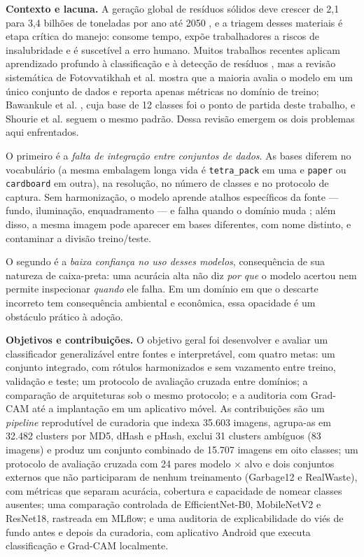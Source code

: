 \documentclass[11pt,a4paper]{article}
\begin{document}
	\textbf{Contexto e lacuna.} A geração global de resíduos sólidos deve crescer de 2,1 para 3,4 bilhões de toneladas por ano até 2050 \cite{kaza2018}, e a triagem desses materiais é etapa crítica do manejo: consome tempo, expõe trabalhadores a riscos de insalubridade e é suscetível a erro humano. Muitos trabalhos recentes aplicam aprendizado profundo à classificação e à detecção de resíduos \cite{fotovvatikhah2025,bawankule2023,shourie2024}, mas a revisão sistemática de Fotovvatikhah et al. \cite{fotovvatikhah2025} mostra que a maioria avalia o modelo em um único conjunto de dados e reporta apenas métricas no domínio de treino; Bawankule et al. \cite{bawankule2023}, cuja base de 12 classes foi o ponto de partida deste trabalho, e Shourie et al. \cite{shourie2024} seguem o mesmo padrão. Dessa revisão emergem os dois problemas aqui enfrentados.
	
	O primeiro é a \emph{falta de integração entre conjuntos de dados}. As bases diferem no vocabulário (a mesma embalagem longa vida é \texttt{tetra\_pack} em uma e \texttt{paper} ou \texttt{cardboard} em outra), na resolução, no número de classes e no protocolo de captura. Sem harmonização, o modelo aprende atalhos específicos da fonte --- fundo, iluminação, enquadramento --- e falha quando o domínio muda \cite{babe2025,geirhos2020}; além disso, a mesma imagem pode aparecer em bases diferentes, com nome distinto, e contaminar a divisão treino/teste.
	
	O segundo é a \emph{baixa confiança no uso desses modelos}, consequência de sua natureza de caixa-preta: uma acurácia alta não diz \emph{por que} o modelo acertou nem permite inspecionar \emph{quando} ele falha. Em um domínio em que o descarte incorreto tem consequência ambiental e econômica, essa opacidade é um obstáculo prático à adoção.
	
	\textbf{Objetivos e contribuições.} O objetivo geral foi desenvolver e avaliar um classificador generalizável entre fontes e interpretável, com quatro metas: um conjunto integrado, com rótulos harmonizados e sem vazamento entre treino, validação e teste; um protocolo de avaliação cruzada entre domínios; a comparação de arquiteturas sob o mesmo protocolo; e a auditoria com Grad-CAM até a implantação em um aplicativo móvel. As contribuições são um \textit{pipeline} reprodutível de curadoria que indexa 35.603 imagens, agrupa-as em 32.482 clusters por MD5, dHash e pHash, exclui 31 clusters ambíguos (83 imagens) e produz um conjunto combinado de 15.707 imagens em oito classes; um protocolo de avaliação cruzada com 24 pares modelo $\times$ alvo e dois conjuntos externos que não participaram de nenhum treinamento (Garbage12 e RealWaste), com métricas que separam acurácia, cobertura e capacidade de nomear classes ausentes; uma comparação controlada de EfficientNet-B0, MobileNetV2 e ResNet18, rastreada em MLflow; e uma auditoria de explicabilidade do viés de fundo antes e depois da curadoria, com aplicativo Android que executa classificação e Grad-CAM localmente.
	
\end{document}
